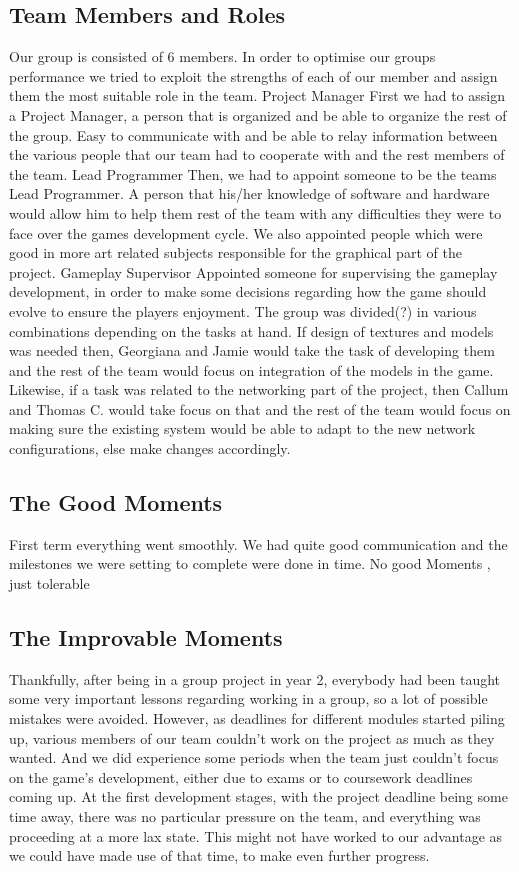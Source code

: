 \documentclass[11pt,a4paper]{article}
\begin{document}
        \subsection{Team Members and Roles}
        Our group is consisted of 6 members. In order to optimise our groups performance we tried to exploit the strengths of each of our member and assign them the most suitable role in the team. 
        Project Manager
        First we had to assign a Project Manager, a person that is organized and be able to organize the rest of the group. Easy to communicate with and be able to relay information between the various people that our team had to cooperate with and the rest members of the team. 
        Lead Programmer
        Then, we had to appoint someone to be the teams Lead Programmer. A person that his/her knowledge of software and hardware would allow him to help them rest of the team with any difficulties they were to face over the games development cycle. We also appointed people which were good in more art related subjects responsible for the graphical part of the project.
        Gameplay Supervisor
        Appointed someone for supervising the gameplay development, in order to make some decisions regarding how the game should evolve to ensure the players enjoyment. 
        The group was divided(?) in various combinations depending on the tasks at hand. If design of textures and models was needed then, Georgiana and Jamie would take the task of developing them and the rest of the team would focus on integration of the models in the game. Likewise, if a task was related to the networking part of the project, then Callum and Thomas C. would take focus on that and the rest of the team would focus on making sure the existing system would be able to adapt to the new network configurations, else make changes accordingly.
         
        \subsection{The Good Moments}
        First term everything went smoothly. We had quite good communication and the milestones we were setting to complete were done in time. No good Moments , just tolerable


        \subsection{The Improvable Moments}
        Thankfully, after being in a group project in year 2, everybody had been taught some very important lessons regarding working in a group, so a lot of possible mistakes were avoided.
        However, as deadlines for different modules started piling up, various members of our team couldn't work on the project as much as they wanted. And we did experience some periods when the team just couldn't focus on the game's development, either due to exams or to coursework deadlines coming up.
        At the first development stages, with the project deadline being some time away, there was no particular pressure on the team, and everything was proceeding at a more lax state. This might not have worked to our advantage as we could have made use of that time, to make even further progress.  
\end{document}
